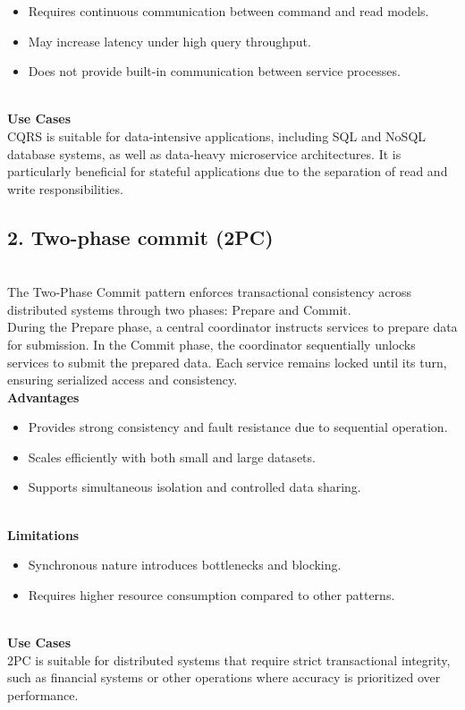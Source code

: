 \begin{itemize}
\item
\protect{}\label{4J9rgIzDnkcx_jUDx5fGy}
Requires continuous communication between command and read models.
\item
\protect{}\label{n6-XUbp-3s4eYvNYOViDi}
May increase latency under high query throughput.
\item
\protect{}\label{1k6KSeZ552rvZi-NBfX-G}
Does not provide built-in communication between service processes.
\end{itemize}
\\
\textbf{Use Cases}
\\
CQRS is suitable for data-intensive applications, including SQL and NoSQL database systems, as well as data-heavy microservice architectures. It is particularly beneficial for stateful applications due to the separation of read and write responsibilities.

\subsection{2. Two-phase commit (2PC)}\label{tEqfrI3VaiW0Nvm2N6Q8n}
\\
The Two-Phase Commit pattern enforces transactional consistency across distributed systems through two phases: Prepare and Commit.
\\
During the Prepare phase, a central coordinator instructs services to prepare data for submission. In the Commit phase, the coordinator sequentially unlocks services to submit the prepared data. Each service remains locked until its turn, ensuring serialized access and consistency.
\\
\textbf{Advantages}

\begin{itemize}
\item
\protect{}\label{Wr0Va2nHZ21Vikr7sc_kq}
Provides strong consistency and fault resistance due to sequential operation.
\item
\protect{}\label{DVL8GJs7Onfy7swkP0Er3}
Scales efficiently with both small and large datasets.
\item
\protect{}\label{6se497-9wvH2VFr1z0mcw}
Supports simultaneous isolation and controlled data sharing.
\end{itemize}
\\
\textbf{Limitations}

\begin{itemize}
\item
\protect{}\label{2xNiWXFlN-7akrDZNvKi3}
Synchronous nature introduces bottlenecks and blocking.
\item
\protect{}\label{wQO3AyG_lT5qE4l7vJftE}
Requires higher resource consumption compared to other patterns.
\end{itemize}
\\
\textbf{Use Cases}
\\
2PC is suitable for distributed systems that require strict transactional integrity, such as financial systems or other operations where accuracy is prioritized over performance.

